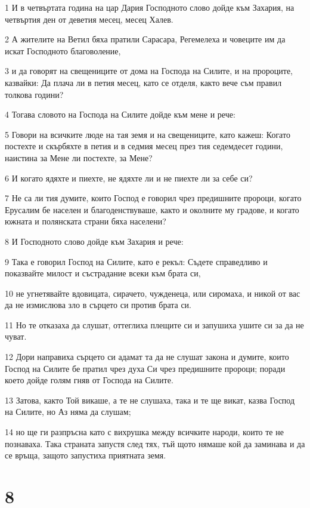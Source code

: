 \par 1 И в четвъртата година на цар Дария Господното слово дойде към Захария, на четвъртия ден от деветия месец, месец Халев.
\par 2 А жителите на Ветил бяха пратили Сарасара, Регемелеха и човеците им да искат Господното благоволение,
\par 3 и да говорят на свещениците от дома на Господа на Силите, и на пророците, казвайки: Да плача ли в петия месец, като се отделя, както вече съм правил толкова години?
\par 4 Тогава словото на Господа на Силите дойде към мене и рече:
\par 5 Говори на всичките люде на тая земя и на свещениците, като кажеш: Когато постехте и скърбяхте в петия и в седмия месец през тия седемдесет години, наистина за Мене ли постехте, за Мене?
\par 6 И когато ядяхте и пиехте, не ядяхте ли и не пиехте ли за себе си?
\par 7 Не са ли тия думите, които Господ е говорил чрез предишните пророци, когато Ерусалим бе населен и благоденствуваше, както и околните му градове, и когато южната и полянската страни бяха населени?
\par 8 И Господното слово дойде към Захария и рече:
\par 9 Така е говорил Господ на Силите, като е рекъл: Съдете справедливо и показвайте милост и състрадание всеки към брата си,
\par 10 не угнетявайте вдовицата, сирачето, чужденеца, или сиромаха, и никой от вас да не измислюва зло в сърцето си против брата си.
\par 11 Но те отказаха да слушат, оттеглиха плещите си и запушиха ушите си за да не чуват.
\par 12 Дори направиха сърцето си адамат та да не слушат закона и думите, които Господ на Силите бе пратил чрез духа Си чрез предишните пророци; поради което дойде голям гняв от Господа на Силите.
\par 13 Затова, както Той викаше, а те не слушаха, така и те ще викат, казва Господ на Силите, но Аз няма да слушам;
\par 14 но ще ги разпръсна като с вихрушка между всичките народи, които те не познаваха. Така страната запустя след тях, тъй щото нямаше кой да заминава и да се връща, защото запустиха приятната земя.

\chapter{8}

